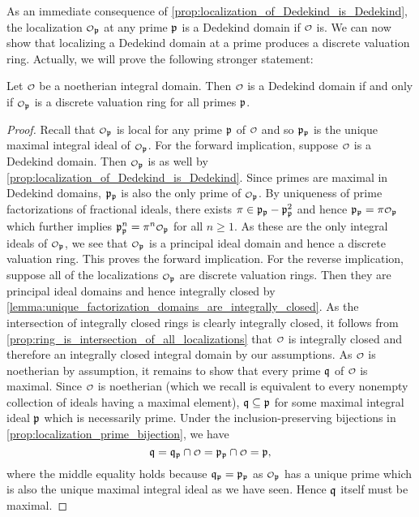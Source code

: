     As an immediate consequence of \cref{prop:localization_of_Dedekind_is_Dedekind}, the localization $\smc{O}_{\mf{p}}$ at any prime $\mathfrak{p}$ is a Dedekind domain if $\smc{O}$ is. We can now show that localizing a Dedekind domain at a prime produces a discrete valuation ring. Actually, we will prove the following stronger statement:

    \begin{theorem}\label{thm:Dedekind_if_and_only_if_all_localizations_are_discrete_valuation_rings}
      Let $\smc{O}$ be a noetherian integral domain. Then $\smc{O}$ is a Dedekind domain if and only if $\smc{O}_{\mf{p}}$ is a discrete valuation ring for all primes $\mathfrak{p}$.
    \end{theorem}
    \begin{proof}
      Recall that $\smc{O}_{\mf{p}}$ is local for any prime $\mathfrak{p}$ of $\smc{O}$ and so $\mathfrak{p}_{\mathfrak{p}}$ is the unique maximal integral ideal of $\smc{O}_{\mf{p}}$. For the forward implication, suppose $\smc{O}$ is a Dedekind domain. Then $\smc{O}_{\mf{p}}$ is as well by \cref{prop:localization_of_Dedekind_is_Dedekind}. Since primes are maximal in Dedekind domains, $\mathfrak{p}_{\mathfrak{p}}$ is also the only prime of $\smc{O}_{\mf{p}}$. By uniqueness of prime factorizations of fractional ideals, there exists $\pi \in \mathfrak{p}_{\mathfrak{p}}-\mathfrak{p}_{\mathfrak{p}}^{2}$ and hence $\mf{p}_{\mf{p}} = \pi\smc{O}_{\mf{p}}$ which further implies $\mf{p}_{\mf{p}}^{n} = \pi^{n}\smc{O}_{\mf{p}}$ for all $n \ge 1$. As these are the only integral ideals of $\smc{O}_{\mf{p}}$, we see that $\smc{O}_{\mf{p}}$ is a principal ideal domain and hence a discrete valuation ring. This proves the forward implication. For the reverse implication, suppose all of the localizations $\smc{O}_{\mf{p}}$ are discrete valuation rings. Then they are principal ideal domains and hence integrally closed by \cref{lemma:unique_factorization_domains_are_integrally_closed}. As the intersection of integrally closed rings is clearly integrally closed, it follows from \cref{prop:ring_is_intersection_of_all_localizations} that $\smc{O}$ is integrally closed and therefore an integrally closed integral domain by our assumptions. As $\smc{O}$ is noetherian by assumption, it remains to show that every prime $\mathfrak{q}$ of $\smc{O}$ is maximal. Since $\smc{O}$ is noetherian (which we recall is equivalent to every nonempty collection of ideals having a maximal element), $\mathfrak{q} \subseteq \mathfrak{p}$ for some maximal integral ideal $\mathfrak{p}$ which is necessarily prime. Under the inclusion-preserving bijections in \cref{prop:localization_prime_bijection}, we have
      \[
        \mf{q} = \mf{q}_{\mf{p}} \cap \smc{O} = \mf{p}_{\mf{p}} \cap \smc{O} = \mf{p},
      \]
      where the middle equality holds because $\mathfrak{q}_{\mathfrak{p}} = \mathfrak{p}_{\mathfrak{p}}$ as $\smc{O}_{\mf{p}}$ has a unique prime which is also the unique maximal integral ideal as we have seen. Hence $\mathfrak{q}$ itself must be maximal.
    \end{proof}

